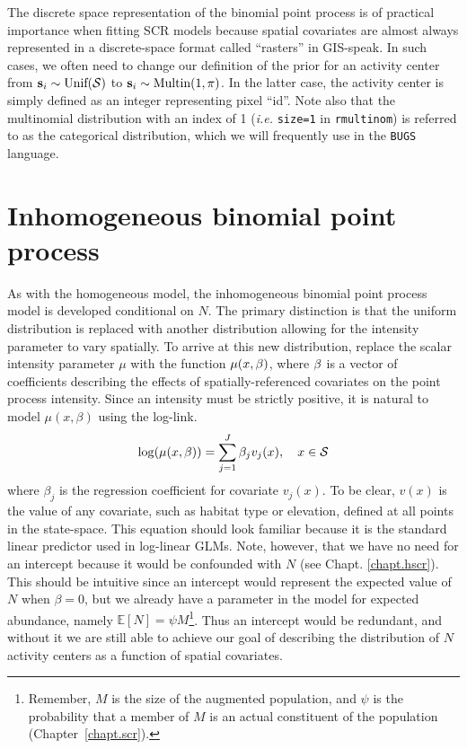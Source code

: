 The discrete space representation of the binomial point process is of
practical importance when fitting SCR models because spatial covariates
are almost always represented in a discrete-space format called
``rasters'' in GIS-speak. In such cases, we often need to change our
definition of the prior for an activity center from ${\bf s}_i \sim
\mbox{Unif}(\cal{S})$ to ${\bf s}_i \sim \mbox{Multin}(1, \mathbf{\pi})$. In the
latter case, the activity center is simply defined as an integer
representing pixel ``id''. Note also that the multinomial distribution
with an index of 1 (\emph{i.e.} \verb+size=1+ in \verb+rmultinom+)
is referred to as the categorical distribution,
which we will frequently use in the \verb+BUGS+ language.



\section{Inhomogeneous binomial point process}

As with the homogeneous model, the inhomogeneous binomial point process
model is developed conditional on $N$. The primary distinction is that
the uniform distribution is replaced with another distribution
allowing for the intensity parameter to vary spatially. To arrive at
this new distribution, replace the scalar intensity parameter $\mu$
with the function $\mu(x, {\bold \beta})$, where $\bold \beta$ is a 
vector of coefficients describing the effects of
spatially-referenced covariates on the point process intensity.
Since an intensity must be strictly
positive, it is natural to model $\mu(x, \beta)$ using the log-link.
\[
\log(\mu(x, \beta)) = \sum_{j=1}^J \beta_j v_j(x), \quad  x \in \cal{S}
\]
where $\beta_j$ is the regression coefficient for covariate
$v_j(x)$. To be clear, $v(x)$ is the value of any covariate, such as
habitat type or elevation, defined at all points in  the state-space.
This equation should look
familiar because it is the standard linear predictor used in log-linear
GLMs. Note, however, that we have no need
for an intercept because it would be confounded with
$N$ (see Chapt. \ref{chapt.hscr}). This should be intuitive since an intercept would
represent the expected value of $N$ when $\beta=0$, but we already
have a parameter in the model for expected abundance, namely $\mathbb{E}[N] =
\psi M$\footnote{Remember, $M$ is the size of the augmented population, and
$\psi$ is the probability that a member of $M$ is an actual
constituent of the population (Chapter~\ref{chapt.scr}).}. Thus an intercept would be
redundant, and without it we are still able to achieve our goal of
describing the distribution of $N$ activity centers as a function of
spatial covariates.

